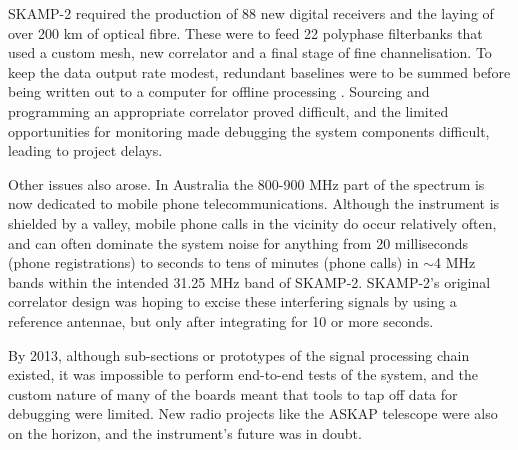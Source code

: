 SKAMP-2 required the production of 88 new digital receivers and the laying of over 200 km of optical fibre. These were to feed 22 polyphase filterbanks that used a custom mesh, new correlator and a final stage of fine channelisation. To keep the data output rate modest, redundant baselines were to be summed before being written out to a computer for offline processing \citep{Adams_2004}. Sourcing and programming an appropriate correlator proved difficult, and the limited opportunities for monitoring made debugging the system components difficult, leading to project delays.

Other issues also arose. In Australia the 800-900 MHz part of the spectrum is now dedicated to mobile phone telecommunications. Although the instrument is shielded by a valley, mobile phone calls in the vicinity do occur relatively often, and can often dominate the system noise for anything from 20 milliseconds (phone registrations) to seconds to tens of minutes (phone calls) in $\sim$4 MHz bands within the intended 31.25 MHz band of SKAMP-2. SKAMP-2's original correlator design was hoping to excise these interfering signals by using a reference antennae, but only after integrating for 10 or more seconds. 

By 2013, although sub-sections or prototypes of the signal processing chain existed, it was impossible to perform end-to-end tests of the system, and the custom nature of many of the boards meant that tools to tap off data for debugging were limited.  New radio projects like the ASKAP telescope were also on the horizon, and the instrument's future was in doubt.
